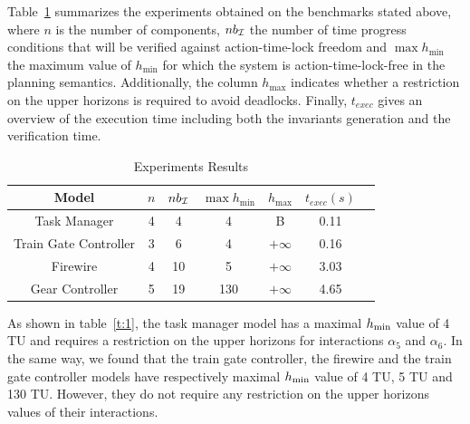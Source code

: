 Table~\ref{t:2} summarizes the experiments obtained on the benchmarks stated above, where $n$ is
the number of components, $nb_{\mathcal{I}}$ the number of time progress conditions that will be 
verified
against action-time-lock freedom and
$\max h_{\min}$ the maximum value of $h_{\min}$ for which the system is action-time-lock-free in 
the planning semantics.
Additionally, the column $h_{\max}$ indicates whether a restriction on the upper horizons is 
required to avoid
deadlocks. Finally, $t_{exec}$ gives an overview of the execution time including both the 
invariants generation and the verification time.

\begin{table}[H]
  \caption{Experiments Results}\label{t:2}
  \centering
  \begin{tabular}{| c || c| c | c | c | c | c |}
  \hline
    Model                              & $n$ & $nb_{\mathcal{I}}$&  $\max h_{\min}$ &   $h_{\max}$ & $t_{exec}(s)$ \\\hline 
    Task Manager                       & 4  & 4  & 4            &  B         & 0.11 \\\hline 
    Train Gate Controller              & 3  & 6  & 4            &  $+\infty$        & 0.16   \\\hline 
    Firewire                           & 4  & 10 & 5            &  $+\infty$        & 3.03   \\\hline 
    Gear Controller                     & 5  & 19 & 130          &  $+\infty$        & 4.65    \\\hline 
  \end{tabular}
\end{table}

As shown in table~\ref{t:1}, the task manager model has a maximal $h_{\min}$ value of 4 TU 
and requires a restriction
on the upper horizons for interactions $\alpha_5$ and $\alpha_6$.
In the same way, we found that the train gate controller, the firewire and the train gate 
controller models have respectively maximal $h_{\min}$ value 
of 4 TU, 5 TU and 130 TU. However, they do not require any restriction on the upper 
horizons values of their interactions.




